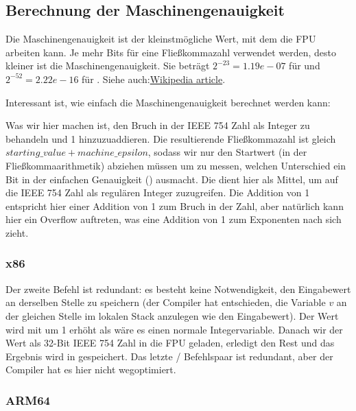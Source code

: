 \subsection{Berechnung der Maschinengenauigkeit}
Die Maschinengenauigkeit ist der kleinstmögliche Wert, mit dem die \ac{FPU} arbeiten kann.
Je mehr Bits für eine Fließkommazahl verwendet werden, desto kleiner ist die Maschinengenauigkeit.
Sie beträgt $2^{-23} = 1.19e-07$ für \Tfloat und $2^{-52} = 2.22e-16$ für \Tdouble.
Siehe auch:\href{http://link.yurichev.com/17367}{Wikipedia article}.

Interessant ist, wie einfach die Maschinengenauigkeit berechnet werden kann:


Was wir hier machen ist, den Bruch in der IEEE 754 Zahl als Integer zu behandeln und 1 hinzuzuaddieren.
Die resultierende Fließkommazahl ist gleich $starting\_value+machine\_epsilon$, sodass wir nur den Startwert (in der
Fließkommaarithmetik) abziehen müssen um zu messen, welchen Unterschied ein Bit in der einfachen Genauigkeit (\Tfloat)
ausmacht.
Die  dient hier als Mittel, um auf die IEEE 754 Zahl als regulären Integer zuzugreifen.
Die Addition von 1 entspricht hier einer Addition von 1 zum Bruch in der Zahl, aber natürlich kann hier ein Overflow
auftreten, was eine Addition von 1 zum Exponenten nach sich zieht.

\subsubsection{x86}


Der zweite  Befehl ist redundant: es besteht keine Notwendigkeit, den Eingabewert an derselben Stelle zu
speichern (der Compiler hat entschieden, die Variable $v$ an der gleichen Stelle im lokalen Stack anzulegen wie den
Eingabewert).
Der Wert wird mit  um 1 erhöht als wäre es einen normale Integervariable.
Danach wir der Wert als 32-Bit IEEE 754 Zahl in die FPU geladen,  erledigt den Rest und das Ergebnis wird in
 gespeichert.
Das letzte / Befehlspaar ist redundant, aber der Compiler hat es hier nicht wegoptimiert.

\subsubsection{ARM64}


